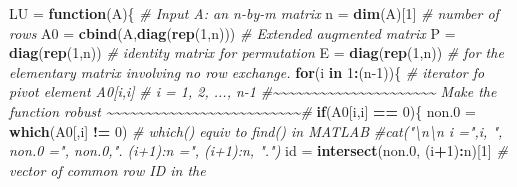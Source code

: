 \documentclass[
]{book}
\newenvironment{Shaded}{\begin{snugshade}}{\end{snugshade}}
\newcommand{\CommentTok}[1]{\textcolor[rgb]{0.56,0.35,0.01}{\textit{#1}}}
\newcommand{\ControlFlowTok}[1]{\textcolor[rgb]{0.13,0.29,0.53}{\textbf{#1}}}
\newcommand{\DecValTok}[1]{\textcolor[rgb]{0.00,0.00,0.81}{#1}}
\newcommand{\FloatTok}[1]{\textcolor[rgb]{0.00,0.00,0.81}{#1}}
\newcommand{\FunctionTok}[1]{\textcolor[rgb]{0.13,0.29,0.53}{\textbf{#1}}}
\newcommand{\NormalTok}[1]{#1}
\newcommand{\OtherTok}[1]{\textcolor[rgb]{0.56,0.35,0.01}{#1}}
\newcommand{\SpecialCharTok}[1]{\textcolor[rgb]{0.81,0.36,0.00}{\textbf{#1}}}
\begin{document}
\begin{Shaded}
\begin{Highlighting}[]
\NormalTok{LU }\OtherTok{=} \ControlFlowTok{function}\NormalTok{(A)\{}
  \CommentTok{\# Input A: an n{-}by{-}m matrix }
\NormalTok{  n }\OtherTok{=} \FunctionTok{dim}\NormalTok{(A)[}\DecValTok{1}\NormalTok{]          }\CommentTok{\# number of rows}
\NormalTok{  A0 }\OtherTok{=} \FunctionTok{cbind}\NormalTok{(A,}\FunctionTok{diag}\NormalTok{(}\FunctionTok{rep}\NormalTok{(}\DecValTok{1}\NormalTok{,n)))                 }\CommentTok{\# Extended augmented matrix}
\NormalTok{  P }\OtherTok{=} \FunctionTok{diag}\NormalTok{(}\FunctionTok{rep}\NormalTok{(}\DecValTok{1}\NormalTok{,n))     }\CommentTok{\# identity matrix for permutation}
\NormalTok{  E }\OtherTok{=} \FunctionTok{diag}\NormalTok{(}\FunctionTok{rep}\NormalTok{(}\DecValTok{1}\NormalTok{,n))     }\CommentTok{\# for the elementary matrix involving no row exchange.}
  \ControlFlowTok{for}\NormalTok{(i }\ControlFlowTok{in} \DecValTok{1}\SpecialCharTok{:}\NormalTok{(n}\DecValTok{{-}1}\NormalTok{))\{     }\CommentTok{\# iterator fo pivot element A0[i,i]}
                         \CommentTok{\# i = 1, 2, ..., n{-}1}
         \CommentTok{\#\textasciitilde{}\textasciitilde{}\textasciitilde{}\textasciitilde{}\textasciitilde{}\textasciitilde{}\textasciitilde{}\textasciitilde{}\textasciitilde{}\textasciitilde{}\textasciitilde{}\textasciitilde{}\textasciitilde{}\textasciitilde{}\textasciitilde{}\textasciitilde{}\textasciitilde{}\textasciitilde{}\textasciitilde{}\textasciitilde{}\textasciitilde{}   Make the function robust  \textasciitilde{}\textasciitilde{}\textasciitilde{}\textasciitilde{}\textasciitilde{}\textasciitilde{}\textasciitilde{}\textasciitilde{}\textasciitilde{}\textasciitilde{}\textasciitilde{}\textasciitilde{}\textasciitilde{}\textasciitilde{}\textasciitilde{}\textasciitilde{}\textasciitilde{}\textasciitilde{}\textasciitilde{}\textasciitilde{}\textasciitilde{}\textasciitilde{}\textasciitilde{}\textasciitilde{}\textasciitilde{}\#}
         \ControlFlowTok{if}\NormalTok{(A0[i,i] }\SpecialCharTok{==} \DecValTok{0}\NormalTok{)\{}
\NormalTok{            non}\FloatTok{.0} \OtherTok{=} \FunctionTok{which}\NormalTok{(A0[,i] }\SpecialCharTok{!=} \DecValTok{0}\NormalTok{)     }\CommentTok{\# which() equiv to find() in MATLAB}
              \CommentTok{\#cat("\textbackslash{}n\textbackslash{}n i =",i, ", non.0 =", non.0,". (i+1):n =", (i+1):n, ".")}
\NormalTok{              id }\OtherTok{=} \FunctionTok{intersect}\NormalTok{(non}\FloatTok{.0}\NormalTok{, (i}\SpecialCharTok{+}\DecValTok{1}\NormalTok{)}\SpecialCharTok{:}\NormalTok{n)[}\DecValTok{1}\NormalTok{] }\CommentTok{\# vector of common row ID in the}

\end{Highlighting}
\end{Shaded}
\end{document}

